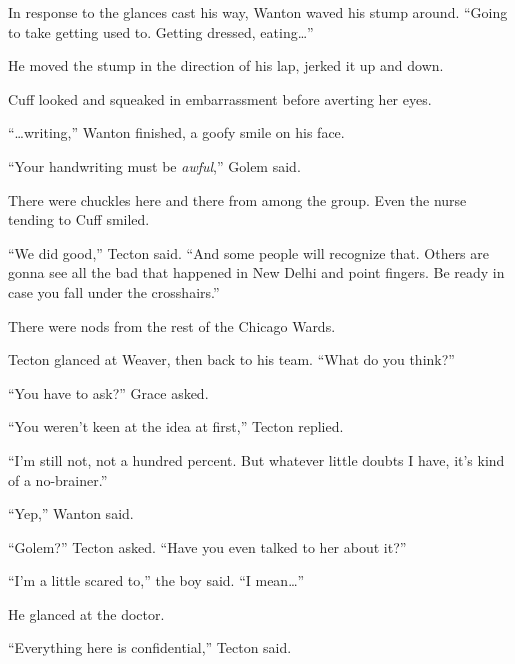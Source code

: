 In response to the glances cast his way, Wanton waved his stump around.  ``Going to take getting used to.  Getting dressed, eating\ldots''



He moved the stump in the direction of his lap, jerked it up and down.



Cuff looked and squeaked in embarrassment before averting her eyes.



``\ldots{}writing,'' Wanton finished, a goofy smile on his face.



``Your handwriting must be \emph{awful},'' Golem said.



There were chuckles here and there from among the group.  Even the nurse tending to Cuff smiled.



``We did good,'' Tecton said.  ``And some people will recognize that.  Others are gonna see all the bad that happened in New Delhi and point fingers.  Be ready in case you fall under the crosshairs.''



There were nods from the rest of the Chicago Wards.



Tecton glanced at Weaver, then back to his team.  ``What do you think?''



``You have to ask?'' Grace asked.



``You weren't keen at the idea at first,'' Tecton replied.



``I'm still not, not a hundred percent.  But whatever little doubts I have, it's kind of a no-brainer.''



``Yep,'' Wanton said.



``Golem?''  Tecton asked.  ``Have you even talked to her about it?''



``I'm a little scared to,'' the boy said.  ``I mean\ldots''



He glanced at the doctor.



``Everything here is confidential,'' Tecton said.



